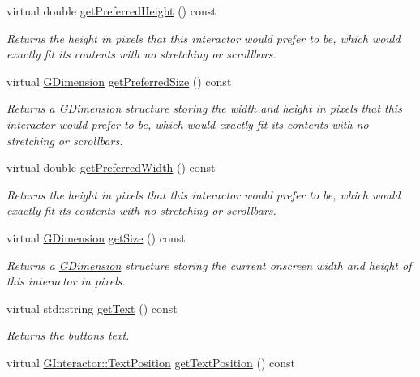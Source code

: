 \begin{DoxyCompactItemize}
virtual double \mbox{\hyperlink{classGInteractor_a747de0961653847bdc6615dbf756d715}{get\+Preferred\+Height}} () const
\begin{DoxyCompactList}\small\item\em Returns the height in pixels that this interactor would prefer to be, which would exactly fit its contents with no stretching or scrollbars. \end{DoxyCompactList}\item 
virtual \mbox{\hyperlink{classGDimension}{G\+Dimension}} \mbox{\hyperlink{classGInteractor_a4aabbee761d8e9116275401131b7ccd1}{get\+Preferred\+Size}} () const
\begin{DoxyCompactList}\small\item\em Returns a \mbox{\hyperlink{classGDimension}{G\+Dimension}} structure storing the width and height in pixels that this interactor would prefer to be, which would exactly fit its contents with no stretching or scrollbars. \end{DoxyCompactList}\item 
virtual double \mbox{\hyperlink{classGInteractor_a82bca31d37700fb0e35d2743352efd5e}{get\+Preferred\+Width}} () const
\begin{DoxyCompactList}\small\item\em Returns the height in pixels that this interactor would prefer to be, which would exactly fit its contents with no stretching or scrollbars. \end{DoxyCompactList}\item 
virtual \mbox{\hyperlink{classGDimension}{G\+Dimension}} \mbox{\hyperlink{classGInteractor_a7b4eec96a2bdc6420695d5796a78eea9}{get\+Size}} () const
\begin{DoxyCompactList}\small\item\em Returns a \mbox{\hyperlink{classGDimension}{G\+Dimension}} structure storing the current onscreen width and height of this interactor in pixels. \end{DoxyCompactList}\item 
virtual std\+::string \mbox{\hyperlink{classGButton_aff553c50924b836c29f146ed34a7c6ec}{get\+Text}} () const
\begin{DoxyCompactList}\small\item\em Returns the button\textquotesingle{}s text. \end{DoxyCompactList}\item 
virtual \mbox{\hyperlink{classGInteractor_a8e0d441725a81d2bbdebbea09078260e}{G\+Interactor\+::\+Text\+Position}} \mbox{\hyperlink{classGButton_a3fc623df3ced62aca93fc344c2426899}{get\+Text\+Position}} () const

\end{DoxyCompactItemize}
